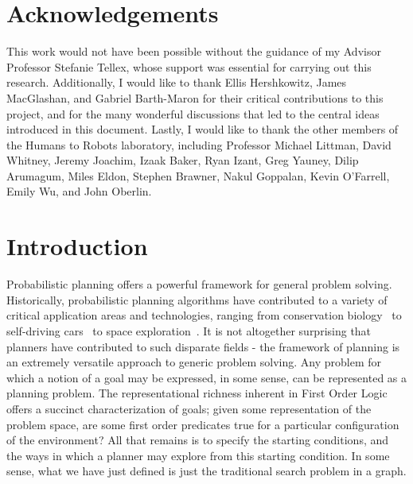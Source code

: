 \documentclass[11pt]{article}
\begin{document}
\newpage

\section*{Acknowledgements}
This work would not have been possible without the guidance of my Advisor Professor Stefanie Tellex, whose support was essential for carrying out this research. Additionally, I would like to thank Ellis Hershkowitz, James MacGlashan, and Gabriel Barth-Maron for their critical contributions to this project, and for the many wonderful discussions that led to the central ideas introduced in this document. Lastly, I would like to thank the other members of the Humans to Robots laboratory, including Professor Michael Littman, David Whitney, Jeremy Joachim, Izaak Baker, Ryan Izant, Greg Yauney, Dilip Arumagum, Miles Eldon, Stephen Brawner, Nakul Goppalan, Kevin O'Farrell, Emily Wu, and John Oberlin.
\newpage
\tableofcontents
\newpage

\section{Introduction}
\label{sec:introduction}

Probabilistic planning offers a powerful framework for general problem solving. Historically, probabilistic planning algorithms have contributed to a variety of critical application areas and technologies, ranging from conservation biology~\cite{possingham1997state} to self-driving cars~\cite{thrun2006stanley,montemerlo2008junior} to space exploration~\cite{bresina2005activity,backes1999automated,chien2000aspen}. It is not altogether surprising that planners have contributed to such disparate fields - the framework of planning is an extremely versatile approach to generic problem solving. Any problem for which a notion of a goal may be expressed, in some sense, can be represented as a planning problem. The representational richness inherent in First Order Logic offers a succinct characterization of goals; given some representation of the problem space, are some first order predicates true for a particular configuration of the environment? All that remains is to specify the starting conditions, and the ways in which a planner may explore from this starting condition. In some sense, what we have just defined is just the traditional search problem in a graph.
\end{document}
